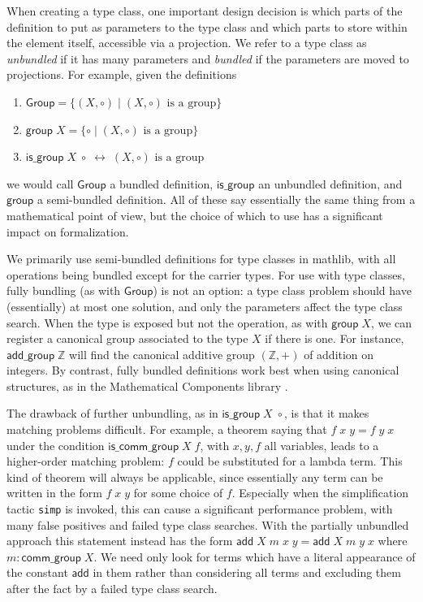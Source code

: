 \documentclass[sigplan]{acmart}\settopmatter{}
\newcommand{\mathlib}{\textsf{mathlib}\xspace}
\newcommand{\mathcomp}{Mathematical Components\xspace}
\begin{document}
When creating a type class, one important design decision is which parts of the definition to put as parameters to the type class and which parts to store within the element itself, accessible via a projection.
We refer to a type class as \emph{unbundled} if it has many parameters and \emph{bundled} if the parameters are moved to projections.
For example, given the definitions
\begin{enumerate}
\item $\mathsf{Group}=\{(X,\circ)\mid (X,\circ)\mbox{ is a group}\}$
\item $\mathsf{group}\;X=\{\circ\mid (X,\circ)\mbox{ is a group}\}$
\item $\mathsf{is\_group}\;X\;\circ\;\leftrightarrow\; (X,\circ)\mbox{ is a group}$
\end{enumerate}
we would call $\mathsf{Group}$ a bundled definition, $\mathsf{is\_group}$ an unbundled definition, and $\mathsf{group}$ a semi-bundled definition.
All of these say essentially the same thing from a mathematical point of view, but the choice of which to use has a significant impact on formalization.

We primarily use semi-bundled definitions for type classes in \mathlib, with all operations being bundled except for the carrier types.
For use with type classes, fully bundling (as with $\mathsf{Group}$) is not an option: a type class problem should have (essentially) at most one solution, and only the parameters affect the type class search.
When the type is exposed but not the operation, as with $\mathsf{group}\;X$, we can register a canonical group associated to the type $X$ if there is one.
For instance, $\mathsf{add\_group}\;\mathbb{Z}$ will find the canonical additive group $(\mathbb{Z},+)$ of addition on integers.
By contrast,
fully bundled definitions work best when using canonical structures,
as in the \mathcomp library \cite{Mahb17}.

The drawback of further unbundling,
as in $\mathsf{is\_group}\;X\;\circ$,
is that it makes matching problems difficult.
For example, a theorem saying that $f\;x\;y=f\;y\;x$
under the condition $\mathsf{is\_comm\_group}\;X\;f$,
with $x,y,f$ all variables,
leads to a higher-order matching problem:
$f$ could be substituted for a lambda term.
This kind of theorem will always be applicable,
since essentially any term can be written in the form $f\;x\;y$ for some choice of $f$.
Especially when the simplification tactic \lstinline{simp} is invoked,
this can cause a significant performance problem,
with many false positives and failed type class searches.
With the partially unbundled approach this statement instead has the form $\mathsf{add}\;X\;m\;x\;y=\mathsf{add}\;X\;m\;y\;x$ where $m:\mathsf{comm\_group}\;X$.
We need only look for terms which have a literal appearance of the constant $\mathsf{add}$ in them rather than considering all terms and excluding them after the fact by a failed type class search.
\end{document}
